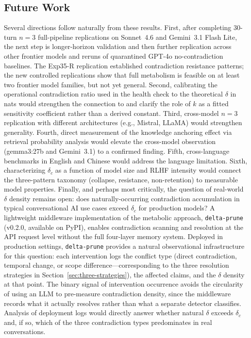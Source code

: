 \documentclass[11pt,a4paper]{article}
\begin{document}
\subsection{Future Work}

Several directions follow naturally from these results.
First, after completing 30-turn $n = 3$ full-pipeline replications on Sonnet~4.6 and Gemini~3.1 Flash Lite, the next step is longer-horizon validation and then further replication across other frontier models and reruns of quarantined GPT-4o no-contradiction baselines. The Exp35-R replication established contradiction resistance patterns; the new controlled replications show that full metabolism is feasible on at least two frontier model families, but not yet general.
Second, calibrating the operational contradiction ratio used in the health check to the theoretical $\delta$ in nats would strengthen the connection to \citet{sunagawa2026collapse} and clarify the role of $k$ as a fitted sensitivity coefficient rather than a derived constant.
Third, cross-model $n = 3$ replication with different architectures (e.g., Mistral, LLaMA) would strengthen generality.
Fourth, direct measurement of the knowledge anchoring effect via retrieval probability analysis would elevate the cross-model observation (gemma3:27b and Gemini~3.1) to a confirmed finding.
Fifth, cross-language benchmarks in English and Chinese would address the language limitation.
Sixth, characterizing $\delta_c$ as a function of model size and RLHF intensity would connect the three-pattern taxonomy (collapse, resistance, non-retention) to measurable model properties.
Finally, and perhaps most critically, the question of real-world $\delta$ density remains open: does naturally-occurring contradiction accumulation in typical conversational AI use cases exceed $\delta_c$ for production models?
A lightweight middleware implementation of the metabolic approach, \texttt{delta-prune} (v0.2.0, available on PyPI), enables contradiction scanning and resolution at the API request level without the full four-layer memory system.
Deployed in production settings, \texttt{delta-prune} provides a natural observational infrastructure for this question: each intervention logs the conflict type (direct contradiction, temporal change, or scope difference---corresponding to the three resolution strategies in Section~\ref{sec:three-strategies}), the affected claims, and the $\delta$ density at that point.
The binary signal of intervention occurrence avoids the circularity of using an LLM to pre-measure contradiction density, since the middleware records what it actually resolves rather than what a separate detector classifies.
Analysis of deployment logs would directly answer whether natural $\delta$ exceeds $\delta_c$ and, if so, which of the three contradiction types predominates in real conversations.
\end{document}
